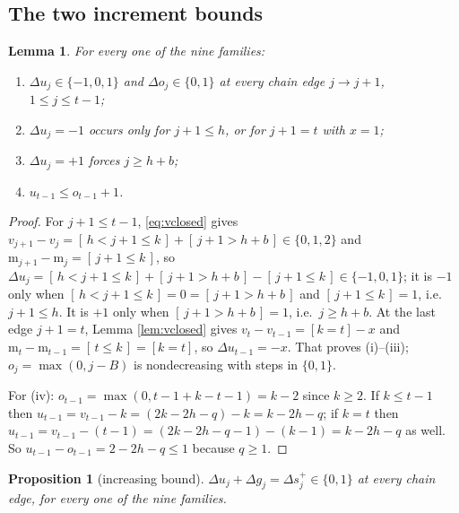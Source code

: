 \documentclass[reqno]{amsart}
\theoremstyle{plain}
\newtheorem{proposition}[theorem]{Proposition}
\newtheorem{lemma}[theorem]{Lemma}
\theoremstyle{definition}
\newcommand{\ms}{\mathrm{m}}
\begin{document}
\subsection{The two increment bounds}

\begin{lemma}\label{lem:increments}
For every one of the nine families:
\begin{enumerate}
\item[\textup{(i)}] $\Delta u_j\in\{-1,0,1\}$ and $\Delta o_j\in\{0,1\}$ at
every chain edge $j\to j+1$, $1\le j\le t-1$;
\item[\textup{(ii)}] $\Delta u_j=-1$ occurs only for $j+1\le h$, or for
$j+1=t$ with $x=1$;
\item[\textup{(iii)}] $\Delta u_j=+1$ forces $j\ge h+b$;
\item[\textup{(iv)}] $u_{t-1}\le o_{t-1}+1$.
\end{enumerate}
\end{lemma}

\begin{proof}
For $j+1\le t-1$, \eqref{eq:vclosed} gives
$v_{j+1}-v_j=[\,h<j+1\le k\,]+[\,j+1>h+b\,]\in\{0,1,2\}$ and
$\ms_{j+1}-\ms_j=[\,j+1\le k\,]$, so
$\Delta u_j=[\,h<j+1\le k\,]+[\,j+1>h+b\,]-[\,j+1\le k\,]\in\{-1,0,1\}$;
it is $-1$ only when $[\,h<j+1\le k\,]=0=[\,j+1>h+b\,]$ and
$[\,j+1\le k\,]=1$, i.e.\ $j+1\le h$.  It is $+1$ only when
$[\,j+1>h+b\,]=1$, i.e.\ $j\ge h+b$.  At the last edge $j+1=t$,
Lemma \ref{lem:vclosed} gives $v_t-v_{t-1}=[k=t]-x$ and
$\ms_t-\ms_{t-1}=[\,t\le k\,]=[k=t]$, so $\Delta u_{t-1}=-x$.  That proves
(i)--(iii); $o_j=\max(0,j-B)$ is nondecreasing with steps in $\{0,1\}$.

For (iv): $o_{t-1}=\max(0,t-1+k-t-1)=k-2$ since $k\ge2$.  If $k\le t-1$ then
$u_{t-1}=v_{t-1}-k=(2k-2h-q)-k=k-2h-q$; if $k=t$ then
$u_{t-1}=v_{t-1}-(t-1)=(2k-2h-q-1)-(k-1)=k-2h-q$ as well.  So
$u_{t-1}-o_{t-1}=2-2h-q\le1$ because $q\ge1$.
\end{proof}

\begin{proposition}[increasing bound]\label{prop:incr}
$\Delta u_j+\Delta g_j=\Delta s^{+}_j\in\{0,1\}$ at every chain edge, for every
one of the nine families.
\end{proposition}
\end{document}
